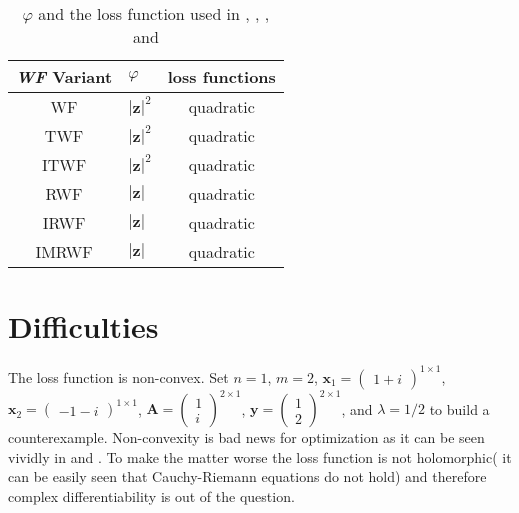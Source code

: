 \begin{table}
	\centering
	\begin{tabular}{||c l c||} 
	 \hline
	 \emph{\ac{WF}} Variant & $\varphi$ 						& loss functions\\ [0.5ex] 
	 \hline\hline
	 \ac{WF}\index{WF}                & $\left|\boldsymbol{z}\right|^2$ 	& quadratic 	\\
	 \ac{TWF}\index{TWF}   & $\left|\boldsymbol{z}\right|^2$ 	& quadratic 	\\
	 \ac{ITWF}\index{ITWF}  & $\left|\boldsymbol{z}\right|^2$   & quadratic 	\\
	 \ac{RWF}\index{RWF}  & $\left|\boldsymbol{z}\right|$ 	& quadratic 	\\
	 \ac{IRWF}\index{IRWF}   & $\left|\boldsymbol{z}\right|$ 	& quadratic 	\\
	 \ac{IMRWF}\index{IMRWF}   & $\left|\boldsymbol{z}\right|$ 	& quadratic 	\\ [1ex]
	 \hline
	\end{tabular}
	\caption{$\varphi$ and the loss function used in \cite{Candes2014}, \cite{Chen2015}, \cite{Kolte2016}, and \cite{Zhang2016}}
	\label{tab:formulation}
	\end{table}
\section{Difficulties}

The loss function is non-convex. Set $n=1$, $m=2$, $\boldsymbol{x}_1 = \begin{pmatrix}1+i\end{pmatrix}^{1 \times 1}$, 
$\boldsymbol{x}_2 = \begin{pmatrix}-1-i\end{pmatrix}^{1 \times 1}$, $\boldsymbol{A}=\begin{pmatrix}1\\i \end{pmatrix}^{2 \times 1}$, 
$\boldsymbol{y}=\begin{pmatrix}1\\2 \end{pmatrix}^{2 \times 1}$, and $\lambda=1/2$ to build a counterexample. Non-convexity is bad news for 
optimization as it can be seen vividly in \cite{Boyd2004} and \cite{Nocedal2006}. To make the matter worse the loss function is not 
holomorphic( it can be easily seen that Cauchy-Riemann equations\cite{Rudin1987} do not hold) and therefore complex differentiability 
is out of the question\cite{Rudin1987}.

